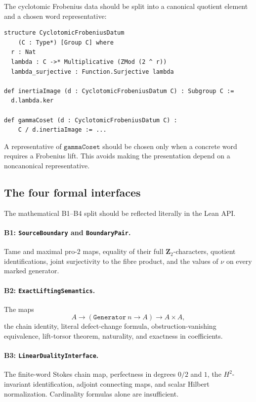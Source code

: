 \documentclass[11pt,reqno]{amsart}
\theoremstyle{definition}
\theoremstyle{remark}
\numberwithin{equation}{section}
\newcommand{\Z}{\mathbf Z}
\begin{document}
The cyclotomic Frobenius data should be split into a canonical quotient
element and a chosen word representative:
\begin{verbatim}
structure CyclotomicFrobeniusDatum
    (C : Type*) [Group C] where
  r : Nat
  lambda : C ->* Multiplicative (ZMod (2 ^ r))
  lambda_surjective : Function.Surjective lambda

def inertiaImage (d : CyclotomicFrobeniusDatum C) : Subgroup C :=
  d.lambda.ker

def gammaCoset (d : CyclotomicFrobeniusDatum C) :
    C / d.inertiaImage := ...
\end{verbatim}
A representative of \(\mathtt{gammaCoset}\) should be chosen only when a
concrete word requires a Frobenius lift.  This avoids making the
presentation depend on a noncanonical representative.

\subsection{The four formal interfaces}

The mathematical B1--B4 split should be reflected literally in the Lean
API.

\paragraph{B1: \texttt{SourceBoundary} and \texttt{BoundaryPair}.}
Tame and maximal pro-\(2\) maps, equality of their full
\(\Z_2\)-characters, quotient identifications, joint surjectivity to the
fibre product, and the values of \(\nu\) on every marked generator.

\paragraph{B2: \texttt{ExactLiftingSemantics}.}
The maps
\[
 A\longrightarrow(\mathtt{Generator}\ n\to A)
 \longrightarrow A\times A,
\]
the chain identity, literal defect-change formula,
obstruction-vanishing equivalence, lift-torsor theorem, naturality, and
exactness in coefficients.

\paragraph{B3: \texttt{LinearDualityInterface}.}
The finite-word Stokes chain map, perfectness in degrees \(0/2\) and \(1\),
the \(H^2\)-invariant identification, adjoint connecting maps, and scalar
Hilbert normalization.  Cardinality formulas alone are insufficient.
\end{document}
